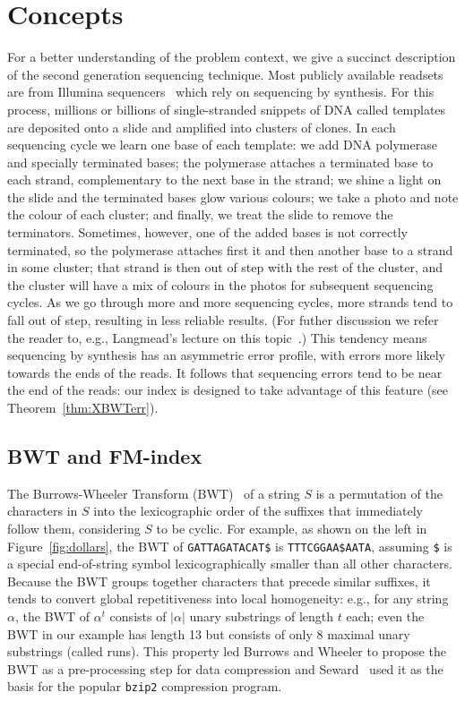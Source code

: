 \section{Concepts} \label{xbwt:sec:concepts}

{For a better understanding of the problem context, we give a succinct description of the second generation sequencing technique.} Most publicly available readsets are from Illumina sequencers~\cite{kodama2012sequence} which rely on sequencing by synthesis.  For this process, millions or billions of single-stranded snippets of DNA called templates are deposited onto a slide and amplified into clusters of clones.  In each sequencing cycle we learn one base of each template: we add DNA polymerase and specially terminated bases; the polymerase attaches a terminated base to each strand, complementary to the next base in the strand; we shine a light on the slide and the terminated bases glow various colours; we take a photo and note the colour of each cluster; and finally, we treat the slide to remove the terminators.  Sometimes, however, one of the added bases is not correctly terminated, so the polymerase attaches first it and then another base to a strand in some cluster; that strand is then out of step with the rest of the cluster, and the cluster will have a mix of colours in the photos for subsequent sequencing cycles.  As we go through more and more sequencing cycles, more strands tend to fall out of step, resulting in less reliable results.  (For futher discussion we refer the reader to, e.g., Langmead's lecture on this topic~\cite{LangmeadVideo}.)  This tendency means sequencing by synthesis has an asymmetric error profile, with errors more likely towards the ends of the reads.  It follows that sequencing errors tend to be near the end of the reads: our index is designed to take advantage of this feature (see Theorem~\ref{thm:XBWTerr}).



\subsection{BWT and FM-index}
\label{subsec:BWT}

The Burrows-Wheeler Transform (BWT)~\cite{burrows1994block} of a string $S$ is a permutation of the characters in $S$ into the lexicographic order of the suffixes that immediately follow them, considering $S$ to be cyclic.  For example, as shown on the left in Figure~\ref{fig:dollars}, the BWT of {\tt GATTAGATACAT\$} is {\tt TTTCGGAA\$AATA}, assuming {\tt \$} is a special end-of-string symbol lexicographically smaller than all other characters.  Because the BWT groups together characters that precede similar suffixes, it tends to convert global repetitiveness into local homogeneity: e.g., for any string $\alpha$, the BWT of $\alpha^t$ consists of $|\alpha|$ unary substrings of length $t$ each; even the BWT in our example has length 13 but consists of only 8 maximal unary substrings (called runs).  This property led Burrows and Wheeler to propose the BWT as a pre-processing step for data compression and Seward~\cite{seward1996bzip2} used it as the basis for the popular {\tt bzip2} compression program.


